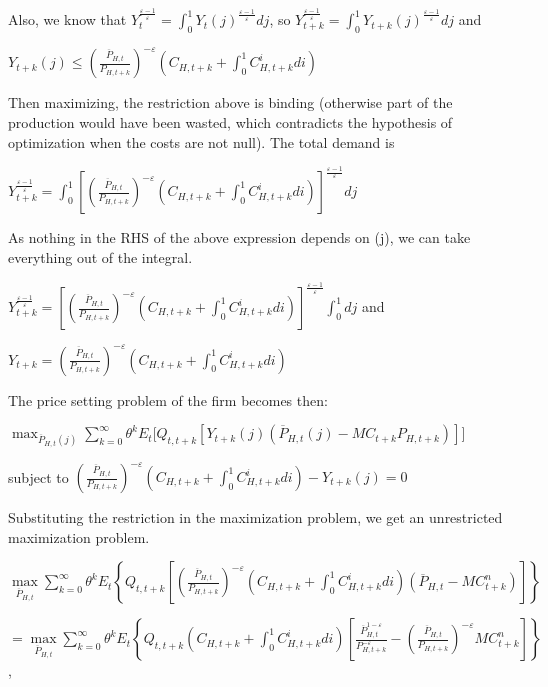 \documentclass[
]{article}
\begin{document}
Also, we know that
\(\displaystyle Y_t^{\frac{\varepsilon-1}{\varepsilon}} = \int_0^1Y_t(j)^{\frac{\varepsilon-1}{\varepsilon}}dj\),
so
\(\displaystyle Y_{t+k}^{\frac{\varepsilon-1}{\varepsilon}} = \int_0^1Y_{t+k}(j)^{\frac{\varepsilon-1}{\varepsilon}}dj\)
and

\(\displaystyle Y_{t+k}(j) \leq \left( \frac{\overline{P}_{H,t}}{P_{H,t+k}} \right)^{-\varepsilon} \left( C_{H,t+k}+\int_0^1C_{H,t+k}^i di\right)\)

Then maximizing, the restriction above is binding (otherwise part of the
production would have been wasted, which contradicts the hypothesis of
optimization when the costs are not null). The total demand is

\(\displaystyle Y_{t+k}^{\frac{\varepsilon-1}{\varepsilon}} = \int_0^1 \left[ \left( \frac{\overline{P}_{H,t}}{P_{H,t+k}} \right)^{-\varepsilon} \left( C_{H,t+k}+\int_0^1C_{H,t+k}^i di\right) \right]^{\frac{\varepsilon-1}{\varepsilon}} dj\)

As nothing in the RHS of the above expression depends on (j), we can
take everything out of the integral.

\(\displaystyle Y_{t+k}^{\frac{\varepsilon-1}{\varepsilon}} = \left[ \left( \frac{\overline{P}_{H,t}}{P_{H,t+k}} \right)^{-\varepsilon} \left( C_{H,t+k}+\int_0^1C_{H,t+k}^i di\right) \right]^{\frac{\varepsilon-1}{\varepsilon}} \int_0^1 dj\)
and

\(\displaystyle Y_{t+k} = \left( \frac{\overline{P}_{H,t}}{P_{H,t+k}} \right)^{-\varepsilon} \left( C_{H,t+k}+\int_0^1C_{H,t+k}^i di\right)\)

The price setting problem of the firm becomes then:

\(\displaystyle \max_{\overline P_{H,t}(j)} \sum^\infty_{k=0} \theta^k E_t \big[ Q_{t, t+k}[Y_{t+k}(j) (\overline P_{H,t}(j) - MC_{t+k} P_{H,t+k})] \big]\)

subject to
\(\displaystyle \left( \frac{\overline{P}_{H,t}}{P_{H,t+k}} \right)^{-\varepsilon} \left( C_{H,t+k}+\int_0^1C_{H,t+k}^i di\right)-Y_{t+k}(j) = 0\)

Substituting the restriction in the maximization problem, we get an
unrestricted maximization problem.

\(\displaystyle \underset{\overline{P}_{H,t}} \max \sum_{k=0}^\infty \theta^kE_t \left\{Q_{t,t+k} \left[ \left( \frac{\overline{P}_{H,t}}{P_{H,t+k}} \right)^{-\varepsilon} \left( C_{H,t+k}+\int_0^1C_{H,t+k}^i di\right) (\overline{P}_{H,t}-MC_{t+k}^n) \right] \right\}\)

\(=\displaystyle \underset{\overline{P}_{H,t}} \max \sum_{k=0}^\infty \theta^kE_t \left\{Q_{t,t+k} \left( C_{H,t+k}+\int_0^1C_{H,t+k}^i di\right) \left[\frac{\overline{P}_{H,t}^{1-\varepsilon}}{P_{H,t+k}^{-\varepsilon}} -\left( \frac{\overline{P}_{H,t}}{P_{H,t+k}} \right)^{-\varepsilon} MC_{t+k}^n \right] \right\}\),
\end{document}
